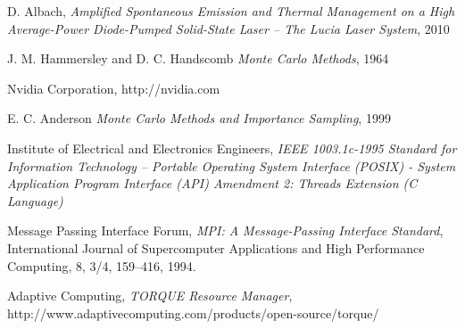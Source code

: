 \begin{thebibliography}{9}


    D. Albach,
    \emph{Amplified Spontaneous Emission and Thermal Management on a High Average-Power Diode-Pumped Solid-State Laser \--- The Lucia Laser System},
    2010

    J. M. Hammersley and D. C. Handscomb
    \emph{Monte Carlo Methods},
    1964

    Nvidia Corporation,
    http://nvidia.com

    E. C. Anderson
    \emph{Monte Carlo Methods and Importance Sampling},
    1999

    Institute of Electrical and Electronics Engineers,
    \emph{IEEE 1003.1c-1995 Standard for Information Technology \---
    Portable Operating System Interface (POSIX) \-- System Application Program Interface (API) Amendment 2: Threads Extension (C Language)}

    Message Passing Interface Forum,
    \emph{MPI: A Message-Passing Interface Standard}, 
    International Journal of Supercomputer Applications and High Performance Computing,
    8, 3/4, 159–416, 1994.

    Adaptive Computing,
    \emph{TORQUE Resource Manager},
    http://www.adaptivecomputing.com/products/open-source/torque/



\end{thebibliography}
